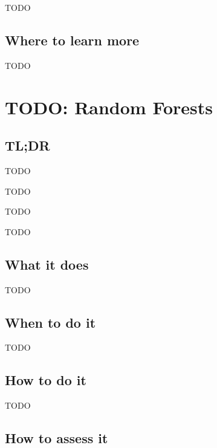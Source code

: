 \documentclass[
]{book}
\providecommand{\tightlist}{%
  \setlength{\itemsep}{0pt}\setlength{\parskip}{0pt}}
\begin{document}
TODO

\hypertarget{where-to-learn-more-16}{%
\section{Where to learn more}\label{where-to-learn-more-16}}

TODO

\hypertarget{random-forests}{%
\chapter{TODO: Random Forests}\label{random-forests}}

\hypertarget{tldr-17}{%
\section{TL;DR}\label{tldr-17}}

\begin{description}
\tightlist
\item[What it does]
TODO
\item[When to do it]
TODO
\item[How to do it]
TODO
\item[How to assess it]
TODO
\end{description}

\hypertarget{what-it-does-17}{%
\section{What it does}\label{what-it-does-17}}

TODO

\hypertarget{when-to-do-it-17}{%
\section{When to do it}\label{when-to-do-it-17}}

TODO

\hypertarget{how-to-do-it-17}{%
\section{How to do it}\label{how-to-do-it-17}}

TODO

\hypertarget{how-to-assess-it-17}{%
\section{How to assess it}\label{how-to-assess-it-17}}
\end{document}
